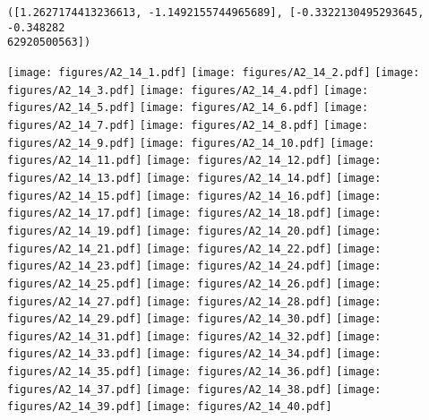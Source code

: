 \documentclass[12pt,a4paper]{article}
\begin{document}
\begin{lstlisting}
([1.2627174413236613, -1.1492155744965689], [-0.3322130495293645, -0.348282
62920500563])
\end{lstlisting}

\texttt{[image: figures/A2\_14\_1.pdf]}
\texttt{[image: figures/A2\_14\_2.pdf]}
\texttt{[image: figures/A2\_14\_3.pdf]}
\texttt{[image: figures/A2\_14\_4.pdf]}
\texttt{[image: figures/A2\_14\_5.pdf]}
\texttt{[image: figures/A2\_14\_6.pdf]}
\texttt{[image: figures/A2\_14\_7.pdf]}
\texttt{[image: figures/A2\_14\_8.pdf]}
\texttt{[image: figures/A2\_14\_9.pdf]}
\texttt{[image: figures/A2\_14\_10.pdf]}
\texttt{[image: figures/A2\_14\_11.pdf]}
\texttt{[image: figures/A2\_14\_12.pdf]}
\texttt{[image: figures/A2\_14\_13.pdf]}
\texttt{[image: figures/A2\_14\_14.pdf]}
\texttt{[image: figures/A2\_14\_15.pdf]}
\texttt{[image: figures/A2\_14\_16.pdf]}
\texttt{[image: figures/A2\_14\_17.pdf]}
\texttt{[image: figures/A2\_14\_18.pdf]}
\texttt{[image: figures/A2\_14\_19.pdf]}
\texttt{[image: figures/A2\_14\_20.pdf]}
\texttt{[image: figures/A2\_14\_21.pdf]}
\texttt{[image: figures/A2\_14\_22.pdf]}
\texttt{[image: figures/A2\_14\_23.pdf]}
\texttt{[image: figures/A2\_14\_24.pdf]}
\texttt{[image: figures/A2\_14\_25.pdf]}
\texttt{[image: figures/A2\_14\_26.pdf]}
\texttt{[image: figures/A2\_14\_27.pdf]}
\texttt{[image: figures/A2\_14\_28.pdf]}
\texttt{[image: figures/A2\_14\_29.pdf]}
\texttt{[image: figures/A2\_14\_30.pdf]}
\texttt{[image: figures/A2\_14\_31.pdf]}
\texttt{[image: figures/A2\_14\_32.pdf]}
\texttt{[image: figures/A2\_14\_33.pdf]}
\texttt{[image: figures/A2\_14\_34.pdf]}
\texttt{[image: figures/A2\_14\_35.pdf]}
\texttt{[image: figures/A2\_14\_36.pdf]}
\texttt{[image: figures/A2\_14\_37.pdf]}
\texttt{[image: figures/A2\_14\_38.pdf]}
\texttt{[image: figures/A2\_14\_39.pdf]}
\texttt{[image: figures/A2\_14\_40.pdf]}
\end{document}
